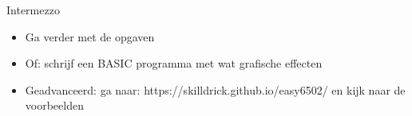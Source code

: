 
\begin{frame}{Intermezzo}

\begin{itemize}
\item Ga verder met de opgaven
\item Of: schrijf een BASIC programma met wat grafische effecten
\item Geadvanceerd: ga naar: https://skilldrick.github.io/easy6502/ en kijk naar
de voorbeelden
\end{itemize}

\end{frame}
